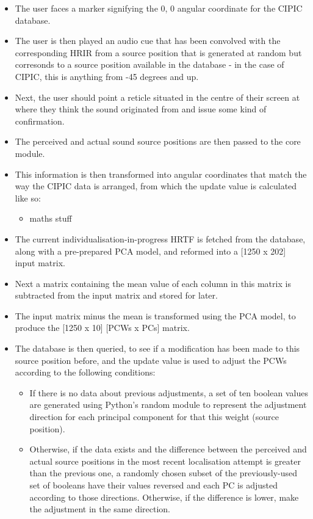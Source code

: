 \begin{itemize}
\item The user faces a marker signifying the 0, 0 angular coordinate for the CIPIC database.
\item The user is then played an audio cue that has been convolved with the corresponding HRIR from a source position that is generated at random but corresonds to a source position available in the database - in the case of CIPIC, this is anything from -45 degrees and up.
\item  Next, the user should point a reticle situated in the centre of their screen at where they think the sound originated from and issue some kind of confirmation. 
\item The perceived and actual sound source positions are then passed to the core module.
\item This information is then transformed into angular coordinates that match the way the CIPIC data is arranged, from which the update value is calculated like so:
\begin{itemize}
\item maths stuff
\end{itemize}
\item The current individualisation-in-progress HRTF is fetched from the database, along with a pre-prepared PCA model, and reformed into a [1250 x 202] input matrix. 
\item Next a matrix containing the mean value of each column in this matrix is subtracted from the input matrix and stored for later. 
\item The input matrix minus the mean is transformed using the PCA model, to produce the [1250 x 10] [PCWs x PCs] matrix. 
\item The database is then queried, to see if a modification has been made to this source position before, and the update value is used to adjust the PCWs according to the following conditions:
\begin{itemize}
\item If there is no data about previous adjustments, a set of ten boolean values are generated using Python's random module\citep{python random} to represent the adjustment direction for each principal component for that this weight (source position). 
\item Otherwise, if the data exists and the difference between the perceived and actual source positions in the most recent localisation attempt is greater than the previous one, a randomly chosen subset of the previously-used set of booleans have their values reversed and each PC is adjusted according to those directions. Otherwise, if the difference is lower, make the adjustment in the same direction. 

\end{itemize}
\end{itemize}
